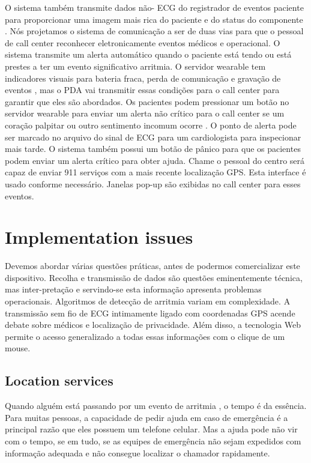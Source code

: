 \documentclass[a4paper,12pt]{article}
\begin{document}
O sistema também transmite dados não- ECG do registrador de eventos paciente para proporcionar uma imagem mais rica do paciente e do status do componente . Nós projetamos o sistema de comunicação a ser de duas vias para que o pessoal de call center reconhecer eletronicamente eventos médicos e operacional. O sistema transmite um alerta automático quando o paciente está tendo ou está prestes a ter um evento significativo arritmia. O servidor wearable tem indicadores visuais para bateria fraca, perda de comunicação e gravação de eventos , mas o PDA vai transmitir essas condições para o call center para garantir que eles são abordados. Os pacientes podem pressionar um botão no servidor wearable para enviar um alerta não crítico para o call center se um coração palpitar ou outro sentimento incomum ocorre . O ponto de alerta pode ser marcado no arquivo do sinal de ECG para um cardiologista para inspecionar mais tarde. O sistema também possui um botão de pânico para que os pacientes podem enviar um alerta crítico para obter ajuda. Chame o pessoal do centro será capaz de enviar 911 serviços com a mais recente localização GPS. Esta interface é usado conforme necessário. Janelas pop-up são exibidas no call center para esses eventos.

\section{Implementation issues}

Devemos abordar várias questões práticas, antes de podermos comercializar este dispositivo. Recolha e transmissão de dados são questões eminentemente técnica, mas inter-pretação e servindo-se esta informação apresenta problemas operacionais. Algoritmos de detecção de arritmia variam em complexidade. A transmissão sem fio de ECG intimamente ligado com coordenadas GPS acende debate sobre médicos e localização de privacidade. Além disso, a tecnologia Web permite o acesso generalizado a todas essas informações com o clique de um mouse.

\subsection{Location services}

Quando alguém está passando por um evento de arritmia , o tempo é da essência. Para muitas pessoas, a capacidade de pedir ajuda em caso de emergência é a principal razão que eles possuem um telefone celular. Mas a ajuda pode não vir com o tempo, se em tudo, se as equipes de emergência não sejam expedidos com informação adequada e não consegue localizar o chamador rapidamente.
\end{document}
